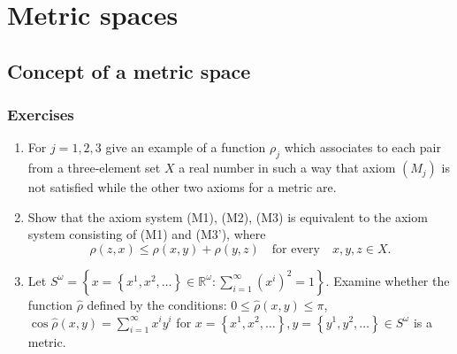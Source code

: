 \chapter{Metric spaces}

\section{Concept of a metric space}

\subsection*{Exercises}

\begin{enumerate}[label={(\alph*)}]
	\item For \( j = 1, 2, 3 \) give an example of a function \( \rho_{j} \) which associates to each pair from a three-element set \( X \) a real number in such a way that axiom \( (M_{j}) \) is not satisfied while the other two axioms for a metric are.
	\item Show that the axiom system (M1), (M2), (M3) is equivalent to the axiom system consisting of (M1) and (M3'), where
	      \begin{equation}
		      \rho(z, x) \le \rho(x, y) + \rho(y, z) \quad \text{for every} \quad x, y, z \in X.
		      \tag{M3'}
	      \end{equation}
	\item Let \( S^{\omega} = \left\{ x = \left\{ x^{1}, x^{2}, \ldots \right\} \in \mathbb{R}^{\omega}: \sum_{i=1}^{\infty} {(x^{i})}^{2} = 1 \right\} \). Examine whether the function \( \hat{\rho} \) defined by the conditions: \( 0 \le \hat{\rho}(x, y) \le \pi \), \( \cos \hat{\rho}(x, y) = \sum_{i=1}^{\infty} x^{i}y^{i} \) for \( x = \left\{ x^{1}, x^{2}, \ldots \right\}, y = \left\{ y^{1}, y^{2}, \ldots \right\} \in S^{\omega} \) is a metric.
\end{enumerate}

